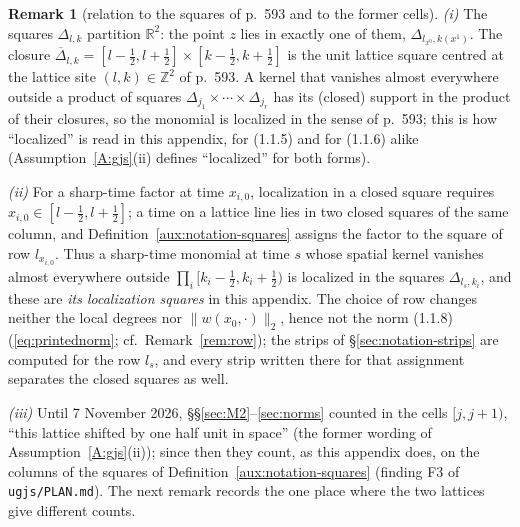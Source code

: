 \documentclass[11pt,a4paper]{article}
\theoremstyle{plain}
\theoremstyle{definition}
\theoremstyle{plain}
\theoremstyle{definition}
\newtheorem{auxrem}[auxlemma]{Remark}
\newcommand{\R}{\mathbb{R}}
\newcommand{\Z}{\mathbb{Z}}
\begin{document}
\begin{auxrem}[relation to the squares of p.~593 and to the former cells]\label{aux:notation-gjslattice}
\emph{(i)} The squares $\Delta_{l,k}$ partition $\R^2$: the point $z$ lies in exactly one of
them, $\Delta_{l_{x^0},k(x^1)}$.  The closure
$\overline{\Delta}_{l,k}=[l-\frac12,l+\frac12]\times[k-\frac12,k+\frac12]$ is the unit
lattice square centred at the lattice site $(l,k)\in\Z^2$ of p.~593.  A kernel that vanishes
almost everywhere outside a product of squares $\Delta_{j_1}\times\cdots\times\Delta_{j_r}$
has its (closed) support in the product of their closures, so the monomial is localized in
the sense of p.~593; this is how ``localized'' is read in this appendix, for (1.1.5) and for
(1.1.6) alike (Assumption~\ref{A:gjs}(ii) defines ``localized'' for both forms).

\emph{(ii)} For a sharp-time factor at time $x_{i,0}$, localization in a closed square
requires $x_{i,0}\in[l-\frac12,l+\frac12]$; a time on a lattice line lies in two closed
squares of the same column, and Definition~\ref{aux:notation-squares} assigns the factor to
the square of row $l_{x_{i,0}}$.  Thus a sharp-time monomial at time $s$ whose spatial
kernel vanishes almost everywhere outside $\prod_i[k_i-\frac12,k_i+\frac12)$ is localized in
the squares $\Delta_{l_s,k_i}$, and these are \emph{its localization squares} in this appendix.
The choice of row changes neither the local degrees nor $\|w(x_0,\cdot)\|_2$, hence not the
norm (1.1.8) (\eqref{eq:printednorm}; cf.\ Remark~\ref{rem:row}); the
strips of \S\ref{sec:notation-strips} are computed for the row $l_s$, and every strip
written there for that assignment separates the closed squares as well.

\emph{(iii)} Until 7 November 2026, \S\S\ref{sec:M2}--\ref{sec:norms} counted in the cells
$[j,j+1)$, ``this lattice shifted by one half unit in space'' (the former wording of
Assumption~\ref{A:gjs}(ii)); since then they count, as this appendix does, on the columns of
the squares of Definition~\ref{aux:notation-squares} (finding F3 of \texttt{ugjs/PLAN.md}).
The next remark records the one place where the two lattices give different counts.


\end{auxrem}
\end{document}
